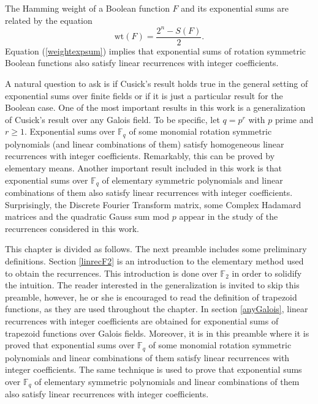 The Hamming weight of a Boolean function $F$ and its exponential sums are related by the equation
\begin{equation}
\label{weightexpsum}
\text{wt}(F)=\frac{2^n-S(F)}{2}.
\end{equation}
Equation (\ref{weightexpsum}) implies that exponential sums of rotation symmetric Boolean functions also satisfy linear recurrences with integer coefficients.

A natural question to ask is if Cusick's result holds true in the general setting of exponential sums over finite fields or if it is just a particular result for the Boolean case.   One of the most important results in this work is a generalization of Cusick's result over any Galois field.  To be specific, let $q=p^r$ with $p$ prime and $r\geq1$. 
Exponential sums over $\mathbb{F}_q$ of some monomial rotation symmetric polynomials (and linear combinations of them) satisfy homogeneous linear recurrences with integer coefficients.  Remarkably, this can be 
proved by elementary means.  %
Another important result included in this work is that exponential sums over $\mathbb{F}_q$ of elementary symmetric polynomials and linear combinations of them also satisfy linear recurrences with integer coefficients.  Surprisingly, the Discrete Fourier Transform matrix, some Complex Hadamard matrices and the quadratic Gauss sum mod $p$ appear in the study of the recurrences considered in this work.

This chapter is divided as follows. The next preamble includes some preliminary definitions.  Section \ref{linrecF2} is an introduction to the elementary method used to obtain the recurrences.  
This introduction is done over $\mathbb{F}_2$ in order to solidify the intuition.  The reader interested in the generalization is invited to skip this preamble, however,  he or she is encouraged to read the 
definition of trapezoid functions, as they are used throughout the chapter. In section \ref{anyGalois}, linear recurrences with integer coefficients are obtained for exponential sums of trapezoid functions 
over Galois fields.  Moreover, it is in this preamble where it is proved that exponential sums over $\mathbb{F}_q$ of some monomial rotation symmetric polynomials and linear combinations of them satisfy 
linear recurrences with integer coefficients.  The same technique is used to prove that exponential sums over $\mathbb{F}_q$ of elementary symmetric polynomials and linear combinations of them also satisfy 
linear recurrences with integer coefficients. 




